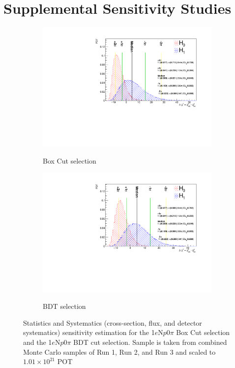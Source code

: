 \documentclass[a4paper]{article}
\newcommand{\npsel}{1$e$N$p$0$\pi$\xspace}
\begin{document}
\newpage

\section{Supplemental Sensitivity Studies}
\label{app:sensitivity}

\begin{figure}[H]
\begin{center}
    \begin{subfigure}[b]{0.48\textwidth}
    \centering
    \includegraphics[width=1.0\textwidth]{Sensitivity/BoxCut/SBNfit_Cls_nue_1e0p_numu_reco_e_H1_newboxcut_noCCMEC_detsyst.pdf}
    \label{fig:1eNp_box_syst}
    \caption{Box Cut selection}
    \end{subfigure}
    \begin{subfigure}[b]{0.48\textwidth}
    \centering
    \includegraphics[width=1.0\textwidth]{Sensitivity/BDT/SBNfit_Cls_nue_1e0p_numu_reco_e_H1_newBDT_noCCMEC_detsyst.pdf}
    \label{fig:1eNp_bdt_syst}
    \caption{BDT selection}
    \end{subfigure}
\caption{\label{fig:1eNp:statsystsensitivity} Statistics and Systematics (cross-section, flux, and detector systematics) sensitivity estimation for the \npsel Box Cut selection and the \npsel BDT cut selection. Sample is taken from combined Monte Carlo samples of Run 1, Run 2, and Run 3 and scaled to $1.01\times10^21$ POT}
\end{center}
\end{figure}
\end{document}
